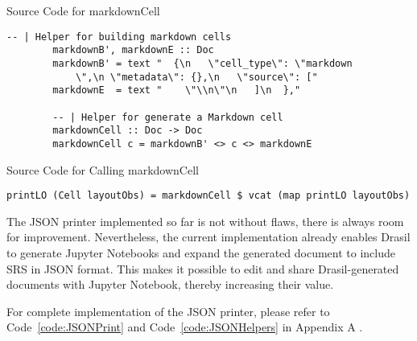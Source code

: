 \begin{listing}[h]
	\caption{Source Code for markdownCell}
	\label{code:markdownCell}
	\begin{lstlisting}[language=haskell1]
		-- | Helper for building markdown cells
		markdownB', markdownE :: Doc
		markdownB' = text "  {\n   \"cell_type\": \"markdown
			\",\n \"metadata\": {},\n   \"source\": [" 
		markdownE  = text "    \"\\n\"\n   ]\n  },"
			
		-- | Helper for generate a Markdown cell
		markdownCell :: Doc -> Doc
		markdownCell c = markdownB' <> c <> markdownE
	\end{lstlisting}
\end{listing}

\begin{listing}[h]
	\caption{Source Code for Calling markdownCell}
	\label{code:callmarkdownCell}
	\begin{lstlisting}[language=haskell1]
		printLO (Cell layoutObs) = markdownCell $ vcat (map printLO layoutObs)
	\end{lstlisting}
\end{listing}

The JSON printer implemented so far is not without flaws, there is always room 
for improvement. Nevertheless, the current implementation already enables 
Drasil to generate Jupyter Notebooks and expand the generated document to 
include SRS in JSON format. This makes it possible to edit and share 
Drasil-generated documents with Jupyter Notebook, thereby increasing their 
value.
 
For complete implementation of the JSON printer, please refer to 
Code~\ref{code:JSONPrint} and Code~\ref{code:JSONHelpers} in Appendix A .